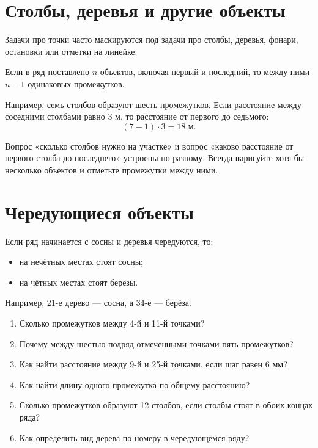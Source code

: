 \section{Столбы, деревья и другие объекты}

\postrowfigure

Задачи про точки часто маскируются под задачи про столбы, деревья, фонари,
остановки или отметки на линейке.

\begin{propertybox}
  Если в ряд поставлено \(n\) объектов, включая первый и последний, то между
  ними \(n-1\) одинаковых промежутков.
\end{propertybox}

Например, семь столбов образуют шесть промежутков. Если расстояние между
соседними столбами равно \(3\) м, то расстояние от первого до седьмого:
\[
  (7-1)\cdot3=18\text{ м}.
\]

\begin{warningbox}
  Вопрос «сколько столбов нужно на участке» и вопрос «каково расстояние от
  первого столба до последнего» устроены по-разному. Всегда нарисуйте хотя бы
  несколько объектов и отметьте промежутки между ними.
\end{warningbox}

\section{Чередующиеся объекты}

\alternatingtreesfigure

Если ряд начинается с сосны и деревья чередуются, то:
\begin{itemize}
  \item на нечётных местах стоят сосны;
  \item на чётных местах стоят берёзы.
\end{itemize}

Например, 21-е дерево --- сосна, а 34-е --- берёза.

\begin{questionsbox}
  \begin{enumerate}
    \item Сколько промежутков между 4-й и 11-й точками?
    \item Почему между шестью подряд отмеченными точками пять промежутков?
    \item Как найти расстояние между 9-й и 25-й точками, если шаг равен
      \(6\) мм?
    \item Как найти длину одного промежутка по общему расстоянию?
    \item Сколько промежутков образуют 12 столбов, если столбы стоят в обоих
      концах ряда?
    \item Как определить вид дерева по номеру в чередующемся ряду?
  \end{enumerate}
\end{questionsbox}

